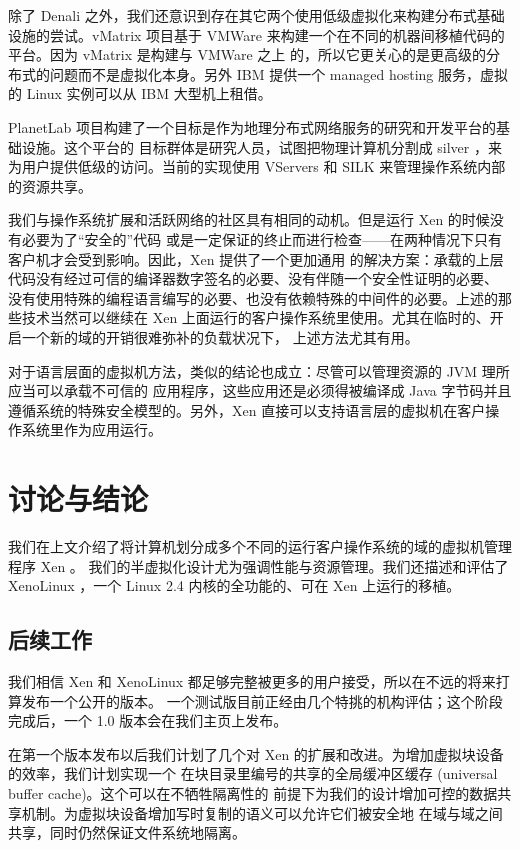 除了 Denali 之外，我们还意识到存在其它两个使用低级虚拟化来构建分布式基础设施的尝试。vMatrix
项目基于 VMWare 来构建一个在不同的机器间移植代码的平台。因为 vMatrix 是构建与 VMWare 之上
的，所以它更关心的是更高级的分布式的问题而不是虚拟化本身。另外 IBM 提供一个 managed hosting
服务，虚拟的 Linux 实例可以从 IBM 大型机上租借。

PlanetLab 项目构建了一个目标是作为地理分布式网络服务的研究和开发平台的基础设施。这个平台的
目标群体是研究人员，试图把物理计算机分割成 silver ，来为用户提供低级的访问。当前的实现使用
VServers 和 SILK 来管理操作系统内部的资源共享。

我们与操作系统扩展和活跃网络的社区具有相同的动机。但是运行 Xen 的时候没有必要为了“安全的”代码
或是一定保证的终止而进行检查——在两种情况下只有客户机才会受到影响。因此，Xen 提供了一个更加通用
的解决方案：承载的上层代码没有经过可信的编译器数字签名的必要、没有伴随一个安全性证明的必要、
没有使用特殊的编程语言编写的必要、也没有依赖特殊的中间件的必要。上述的那些技术当然可以继续在
Xen 上面运行的客户操作系统里使用。尤其在临时的、开启一个新的域的开销很难弥补的负载状况下，
上述方法尤其有用。

对于语言层面的虚拟机方法，类似的结论也成立：尽管可以管理资源的 JVM 理所应当可以承载不可信的
应用程序，这些应用还是必须得被编译成 Java 字节码并且遵循系统的特殊安全模型的。另外，Xen
直接可以支持语言层的虚拟机在客户操作系统里作为应用运行。

\section{讨论与结论}

我们在上文介绍了将计算机划分成多个不同的运行客户操作系统的域的虚拟机管理程序 Xen 。
我们的半虚拟化设计尤为强调性能与资源管理。我们还描述和评估了 XenoLinux ，一个 Linux 2.4
内核的全功能的、可在 Xen 上运行的移植。

\subsection{后续工作}

我们相信 Xen 和 XenoLinux 都足够完整被更多的用户接受，所以在不远的将来打算发布一个公开的版本。
一个测试版目前正经由几个特挑的机构评估；这个阶段完成后，一个 1.0 版本会在我们主页上发布。

在第一个版本发布以后我们计划了几个对 Xen 的扩展和改进。为增加虚拟块设备的效率，我们计划实现一个
在块目录里编号的共享的全局缓冲区缓存 (universal buffer cache)。这个可以在不牺牲隔离性的
前提下为我们的设计增加可控的数据共享机制。为虚拟块设备增加写时复制的语义可以允许它们被安全地
在域与域之间共享，同时仍然保证文件系统地隔离。

